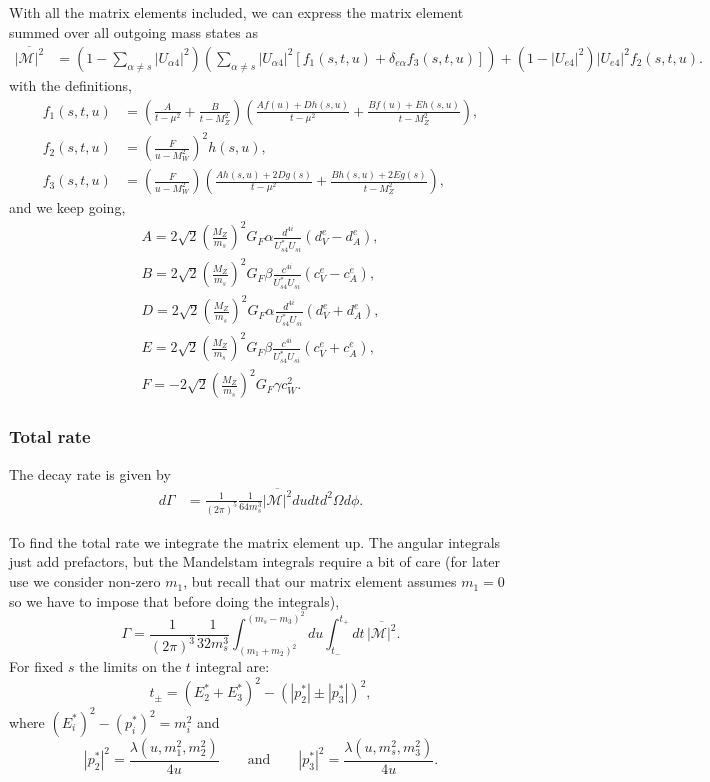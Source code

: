 \documentclass[11pt, a4paper]{article}
\begin{document}
With all the matrix elements included, we can express the matrix element summed over all outgoing mass states as 
%
\begin{align*} 
%
\overline{\left|\mathcal{M}\right|^2} &= \left(1-\sum_{\alpha\neq s}|U_{\alpha 4}|^2\right)\left( \sum_{\alpha\neq s}|U_{\alpha 4}|^2\left[f_1(s,t,u)+\delta_{e\alpha}f_3(s,t,u)\right]\right) + \left(1-|U_{e 4}|^2\right)|U_{e 4}|^2f_2(s,t,u).
%
\end{align*}
%
with the definitions,
%
\begin{align*}  
%
f_1(s,t,u) &= \left( \frac{A}{t-\mu^2} + \frac{B}{t-M_Z^2}\right)\left(\frac{Af(u) + Dh(s,u)}{t-\mu^2} + \frac{Bf(u)+Eh(s,u)}{t-M_Z^2}\right),\\
%
f_2(s,t,u) &= \left( \frac{F}{u-M_W^2} \right)^2h(s,u),\\
%
f_3(s,t,u) &= \left( \frac{F}{u-M_W^2} \right)\left(\frac{Ah(s,u) + 2Dg(s)}{t-\mu^2} + \frac{Bh(s,u)+2Eg(s)}{t-M_Z^2}\right),
%
\end{align*}
%
and we keep going,
%
\begin{align*}  
%
A = 2\sqrt{2}\left(\frac{M_Z}{m_s}\right)^2G_F\alpha \frac{d^{4i}}{U^*_{s4}U_{si}}(d^e_V-d^e_A), \\
B = 2\sqrt{2}\left(\frac{M_Z}{m_s}\right)^2G_F\beta \frac{c^{4i}}{U^*_{s4}U_{si}}(c^e_V-c^e_A), \\
D = 2\sqrt{2}\left(\frac{M_Z}{m_s}\right)^2G_F\alpha\frac{d^{4i}}{U^*_{s4}U_{si}}(d^e_V+d^e_A), \\
E = 2\sqrt{2}\left(\frac{M_Z}{m_s}\right)^2G_F\beta \frac{c^{4i}}{U^*_{s4}U_{si}}(c^e_V+c^e_A), \\
F = - 2\sqrt{2}\left(\frac{M_Z}{m_s}\right)^2G_F\gamma c_W^2. 
%
\end{align*}


\subsubsection{Total rate}

The decay rate is given by
%
\begin{align*} 
%
d\Gamma &= \frac{1}{(2\pi)^5}\frac{1}{64m^3_s}\overline{\left|\mathcal{M}\right|^2}
du dt d^2\Omega d\phi.
%
\end{align*}

To find the total rate we integrate the matrix element up. The angular integrals just add prefactors, but the Mandelstam integrals require a bit of care (for later use we consider non-zero $m_1$, but recall that our matrix element assumes $m_1=0$ so we have to impose that before doing the integrals),
%
\[  \Gamma = \frac{1}{(2\pi)^3}\frac{1}{32m^3_s}\int_{(m_1+m_2)^2}^{(m_s-m_3)^2}du\int_{t_-}^{t_+}dt\,\overline{\left|\mathcal{M}\right|^2}. \]
%
For fixed $s$ the limits on the $t$ integral are: 
%
\[ t_\pm = \left(E_2^* + E_3^*\right)^2 - \left(|p_2^*| \pm |p_3^*|\right)^2, \]
%
where $\left(E^*_i\right)^2 - \left(p^*_i\right)^2 = m_i^2$ and 
%
\[   |p^*_2|^2 = \frac{\lambda(u,m_1^2,m_2^2)}{4u} \qquad\text{and}\qquad  |p^*_3|^2 = \frac{\lambda(u,m_s^2,m_3^2)}{4u}. \]
%
\end{document}
